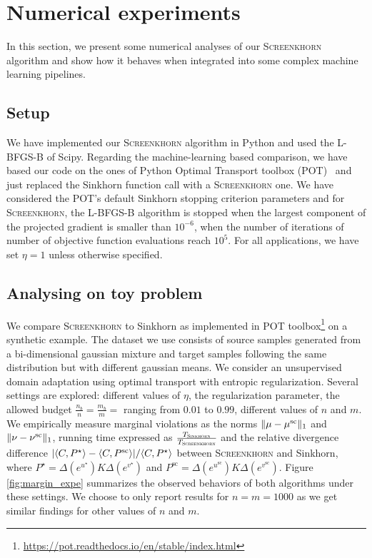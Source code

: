 
\section{Numerical experiments} %
\label{sec:numerical_experiments}

In this section, we present some numerical analyses of our
\textsc{Screenkhorn} algorithm and show how it behaves when
integrated into some complex machine learning pipelines.

\subsection{Setup}

We have implemented our \textsc{Screenkhorn} algorithm in Python and used the L-BFGS-B of
Scipy. Regarding the machine-learning based comparison, we have based our code
on the ones of Python Optimal Transport toolbox (POT)~\citep{flamary2017pot} and just replaced the Sinkhorn function call with a \textsc{Screenkhorn} one. We have considered the POT's default Sinkhorn stopping criterion parameters and for \textsc{Screenkhorn}, the L-BFGS-B algorithm is stopped when the 
largest component of the projected gradient is smaller than $10^{-6}$, when the number of iterations of number of objective function evaluations reach $10^{5}$. For all applications, we have set $\eta=1$ unless otherwise specified.

\subsection{Analysing on toy problem}
\label{subsec:analysing_toy_problem}

We compare \textsc{Screenkhorn} to Sinkhorn as implemented in POT toolbox\footnote{\url{https://pot.readthedocs.io/en/stable/index.html}} on  a synthetic example. The dataset we use consists of source samples generated from a bi-dimensional gaussian mixture and target samples following the same distribution but with different gaussian means. We consider an unsupervised domain adaptation using optimal transport with entropic regularization.  Several settings are explored: different values of $\eta$, the regularization parameter, the allowed budget $\frac{n_b}{n} = \frac{m_b}{m} = $ ranging from $0.01$ to $0.99$, different values of $n$ and $m$.
 We empirically measure  marginal violations as the norms $\|{\mu} -{\mu}^{\text{sc}}\|_1$ and $\|{\nu} -{\nu}^{\text{sc}}\|_1$, running time expressed as $\frac{T_{\textsc{Sinkhorn}}}{T_{\text{\textsc{Screenkhorn}}}}$ and the relative divergence difference $| \langle C, P^\star \rangle - \langle C, P^{\text{sc}} \rangle|/\langle C, P^\star \rangle$ between \textsc{Screenkhorn} and Sinkhorn, where $P^\star = \Delta(e^{u^\star}) K \Delta(e^{v^\star})$ and $P^{\text{sc}} = \Delta(e^{u^{\text{sc}}}) K \Delta(e^{v^{\text{sc}}}).$
Figure \ref{fig:margin_expe} summarizes the observed behaviors of both algorithms under these settings. We choose to only report results for $n=m=1000$ as we get similar findings for other values of $n$ and $m$. 

